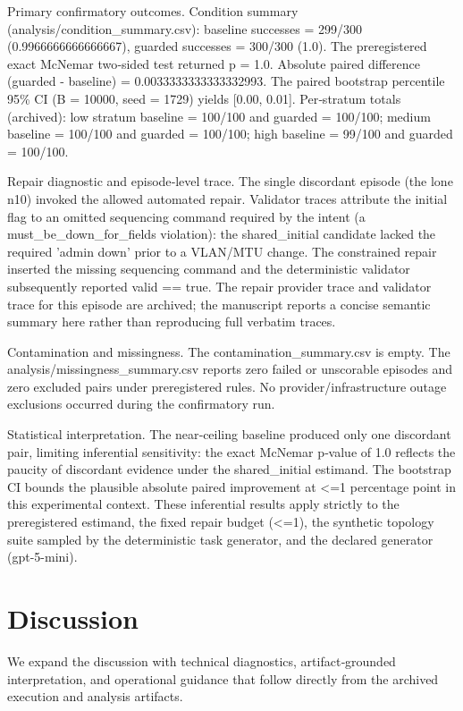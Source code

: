 \documentclass[conference]{IEEEtran}
\begin{document}
Primary confirmatory outcomes. Condition summary (analysis/condition\_summary.csv): baseline successes = 299/300 (0.9966666666666667), guarded successes = 300/300 (1.0). The preregistered exact McNemar two‑sided test returned p = 1.0. Absolute paired difference (guarded - baseline) = 0.0033333333333332993. The paired bootstrap percentile 95\% CI (B = 10000, seed = 1729) yields [0.00, 0.01]. Per‑stratum totals (archived): low stratum baseline = 100/100 and guarded = 100/100; medium baseline = 100/100 and guarded = 100/100; high baseline = 99/100 and guarded = 100/100.

Repair diagnostic and episode‑level trace. The single discordant episode (the lone n10) invoked the allowed automated repair. Validator traces attribute the initial flag to an omitted sequencing command required by the intent (a must\_be\_down\_for\_fields violation): the shared\_initial candidate lacked the required 'admin down' prior to a VLAN/MTU change. The constrained repair inserted the missing sequencing command and the deterministic validator subsequently reported valid == true. The repair provider trace and validator trace for this episode are archived; the manuscript reports a concise semantic summary here rather than reproducing full verbatim traces.

Contamination and missingness. The contamination\_summary.csv is empty. The analysis/missingness\_summary.csv reports zero failed or unscorable episodes and zero excluded pairs under preregistered rules. No provider/infrastructure outage exclusions occurred during the confirmatory run.

Statistical interpretation. The near‑ceiling baseline produced only one discordant pair, limiting inferential sensitivity: the exact McNemar p‑value of 1.0 reflects the paucity of discordant evidence under the shared\_initial estimand. The bootstrap CI bounds the plausible absolute paired improvement at <=1 percentage point in this experimental context. These inferential results apply strictly to the preregistered estimand, the fixed repair budget (<=1), the synthetic topology suite sampled by the deterministic task generator, and the declared generator (gpt-5-mini).

\section{Discussion}
We expand the discussion with technical diagnostics, artifact‑grounded interpretation, and operational guidance that follow directly from the archived execution and analysis artifacts.
\end{document}
